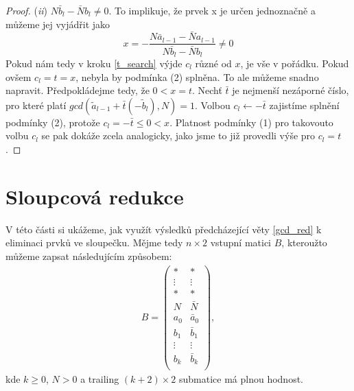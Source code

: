 \begin{proof}
(\textit{ii}) $ N \bar{b}_l - \bar{N} b_l \neq 0 $.
To implikuje, že prvek x je určen jednoznačně a můžeme jej vyjádřit jako
\begin{equation}\label{frac}
    x = -\frac{N \bar{a}_{l-1} - \bar{N} a_{l-1}} {N \bar{b}_l - \bar{N} b_l}
      \neq 0
\end{equation}
Pokud nám tedy v kroku \ref{t_search} výjde $ c_l $ různé od $ x $, je vše v pořádku.
Pokud ovšem $ c_l = t = x $, nebyla by podmínka (2) splněna.
To ale můžeme snadno napravit. Předpokládejme tedy, že $ 0 < x = t $.
Nechť $ \bar{t} $ je nejmenší nezáporné číslo, pro které platí
$ gcd(\tilde{a}_{l-1} + \bar{t} (-\tilde{b}_{l}), N) = 1 $. Volbou $ c_l \leftarrow -\bar{t}$
zajistíme splnění podmínky (2), protože $ c_l = -\bar{t} \leq 0 < x $. Platnost
podmínky (1) pro takovouto volbu $ c_l $ se pak dokáže zcela analogicky, jako
jsme to již provedli výše pro $ c_l = t $.
\end{proof}





\section{Sloupcová redukce}

V této části si ukážeme, jak využít výsledků předcházející věty \ref{gcd_red} k
eliminaci prvků ve sloupečku. Mějme tedy $ n \times 2 $
vstupní matici $ B $, kteroužto můžeme zapsat následujícím způsobem:
\begin{align} \label{B_col}
B =
    \begin{pmatrix}
        \ast   & \ast   \\
        \vdots & \vdots \\
        \ast   & \ast   \\
        N & \bar{N} \\
        a_0 & \bar{a}_0  \\
        b_1 & \bar{b}_1  \\
        \vdots & \vdots  \\
        b_k & \bar{b}_k  \\
    \end{pmatrix}
,
\end{align}
kde $ k \geq 0 $, $ N > 0 $ a trailing $ (k+2) \times 2 $ submatice má plnou
hodnost.

